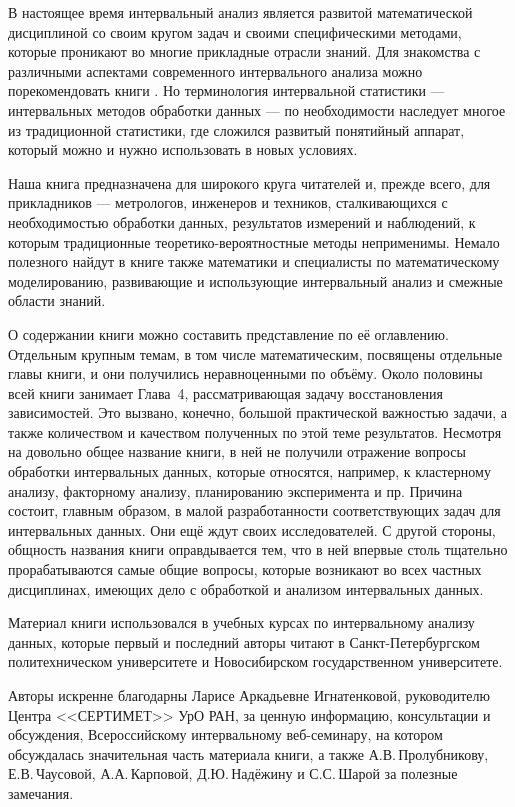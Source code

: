 \documentclass[a5paper,openany]{book}
\begin{document}
В настоящее время интервальный анализ является развитой математической  дисциплиной 
со своим кругом задач и своими специфическими методами, которые проникают во многие 
прикладные отрасли знаний. Для знакомства с различными аспектами современного 
интервального анализа можно порекомендовать книги \cite{AlefeldHerzberg, ApplInteAnal, 
SSharyBook, MayerBook, MooreBakerCloud, NeumaierBook}. Но терминология интервальной 
статистики --- интервальных методов обработки данных --- по необходимости наследует 
многое из традиционной статистики, где сложился развитый понятийный аппарат, который 
можно и нужно использовать в новых условиях. 
  
Наша книга предназначена  для широкого круга читателей и, прежде всего,  для 
прикладников --- метрологов, инженеров и техников, сталкивающихся с необходимостью 
обработки данных, результатов измерений и наблюдений, к которым традиционные 
теоретико-вероятностные методы неприменимы. Немало полезного найдут в книге 
также математики и специалисты по математическому моделированию, развивающие 
и использующие интервальный анализ и смежные области знаний. 
  
О содержании книги можно составить представление по её оглавлению. Отдельным крупным 
темам, в том числе математическим, посвящены отдельные главы книги, и они получились 
неравноценными по объёму. Около половины всей книги занимает Глава~4, рассматривающая 
задачу восстановления зависимостей. Это вызвано, конечно, большой практической 
важностью задачи, а также количеством и качеством полученных по этой теме результатов. 
Несмотря на довольно общее название книги, в ней не получили отражение вопросы 
обработки интервальных данных, которые относятся, например, к кластерному анализу, 
факторному анализу, планированию эксперимента и пр. Причина состоит, главным образом, 
в малой разработанности соответствующих задач для интервальных данных. Они ещё 
ждут своих исследователей. С другой стороны, общность названия книги оправдывается 
тем, что в ней впервые столь тщательно прорабатываются самые общие вопросы, которые 
возникают во всех частных дисциплинах, имеющих дело с обработкой и анализом 
интервальных данных. 
   
Материал книги использовался в учебных курсах по интервальному анализу данных, 
которые первый и последний авторы читают в Санкт-Петербургском политехническом  
университете и Новосибирском государственном университете. 
  
Авторы искренне благодарны Ларисе Аркадьевне Игнатенковой, руководителю Центра 
<<СЕРТИМЕТ>> УрО РАН, за ценную информацию, консультации и обсуждения, 
Всероссийскому интервальному веб-семинару, на котором обсуждалась значительная 
часть материала книги, а также А.В.\,Пролубникову, Е.В.\,Чаусовой, А.А.\,Карповой, 
Д.Ю.\,Надёжину и С.С.\,Шарой за полезные замечания. 
  
\end{document}
